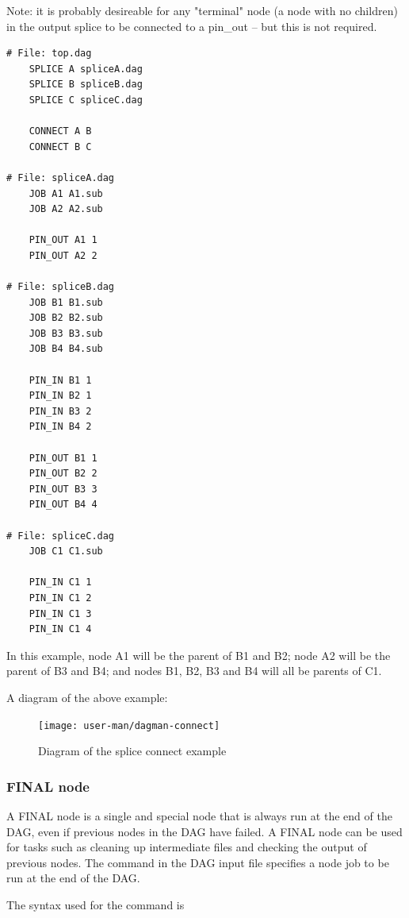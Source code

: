 Note:  it is probably desireable for any "terminal" node (a
node with no children) in the output splice to be connected to
a pin\_out -- but this is not required.

\begin{verbatim}
# File: top.dag
    SPLICE A spliceA.dag
    SPLICE B spliceB.dag
    SPLICE C spliceC.dag

    CONNECT A B
    CONNECT B C

# File: spliceA.dag
    JOB A1 A1.sub
    JOB A2 A2.sub

    PIN_OUT A1 1
    PIN_OUT A2 2

# File: spliceB.dag
    JOB B1 B1.sub
    JOB B2 B2.sub
    JOB B3 B3.sub
    JOB B4 B4.sub

    PIN_IN B1 1
    PIN_IN B2 1
    PIN_IN B3 2
    PIN_IN B4 2

    PIN_OUT B1 1
    PIN_OUT B2 2
    PIN_OUT B3 3
    PIN_OUT B4 4

# File: spliceC.dag
    JOB C1 C1.sub

    PIN_IN C1 1 
    PIN_IN C1 2 
    PIN_IN C1 3
    PIN_IN C1 4

\end{verbatim}
In this example, node A1 will be the parent of B1 and B2; node
A2 will be the parent of B3 and B4; and nodes B1, B2, B3 and B4 will all
be parents of C1.

A diagram of the above example:

\begin{figure}[hbt]
\centering
\texttt{[image: user-man/dagman-connect]}
\caption{\label{fig:dagman-connect}Diagram of the splice connect example}
\end{figure}

\subsubsection{\label{sec:DAGFinalNode}FINAL node}

A FINAL node is a single and special node that is always run at 
the end of the DAG,
even if previous nodes in the DAG have failed.  
A FINAL node can be used
for tasks such as cleaning up intermediate files and checking the output
of previous nodes.
The  command in the DAG input file specifies 
a node job to be run at the end of the DAG.  

The syntax used for the  command is

